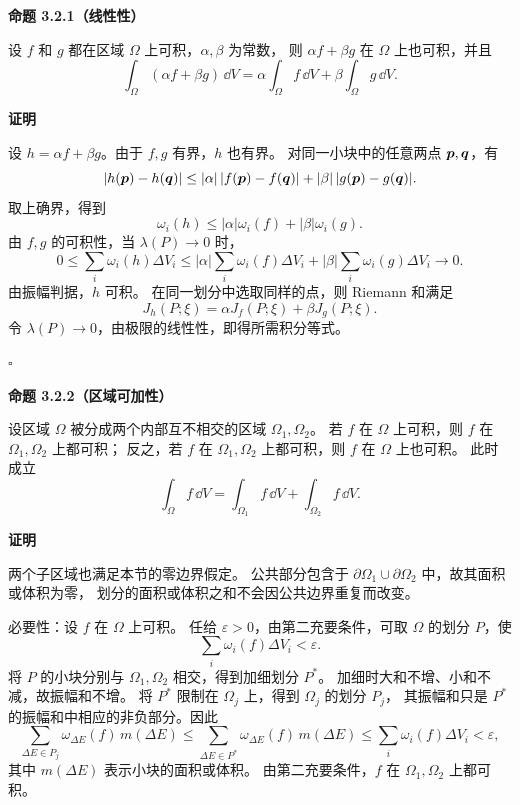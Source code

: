 \textbf{命题 3.2.1（线性性）}


设 $f$ 和 $g$ 都在区域 $\Omega$ 上可积，$\alpha,\beta$ 为常数，
则 $\alpha f+\beta g$ 在 $\Omega$ 上也可积，并且
\[
\int_\Omega(\alpha f+\beta g)\,\dd V
=\alpha\int_\Omega f\,\dd V+\beta\int_\Omega g\,\dd V.
\]





\textbf{证明}

设 $h=\alpha f+\beta g$。由于 $f,g$ 有界，$h$ 也有界。
对同一小块中的任意两点 $\boldsymbol{p},\boldsymbol{q}$，有
\[
|h(\boldsymbol{p})-h(\boldsymbol{q})|
\le|\alpha|\,|f(\boldsymbol{p})-f(\boldsymbol{q})|
+|\beta|\,|g(\boldsymbol{p})-g(\boldsymbol{q})|.
\]
取上确界，得到
\[
\omega_i(h)\le|\alpha|\omega_i(f)+|\beta|\omega_i(g).
\]
由 $f,g$ 的可积性，当 $\lambda(P)\to0$ 时，
\[
0\le\sum_i\omega_i(h)\Delta V_i
\le|\alpha|\sum_i\omega_i(f)\Delta V_i
+|\beta|\sum_i\omega_i(g)\Delta V_i\longrightarrow0.
\]
由振幅判据，$h$ 可积。
在同一划分中选取同样的点，则 Riemann 和满足
\[
J_h(P;\xi)=\alpha J_f(P;\xi)+\beta J_g(P;\xi).
\]
令 $\lambda(P)\to0$，由极限的线性性，即得所需积分等式。


$\square$





\textbf{命题 3.2.2（区域可加性）}


设区域 $\Omega$ 被分成两个内部互不相交的区域 $\Omega_1,\Omega_2$。
若 $f$ 在 $\Omega$ 上可积，则 $f$ 在 $\Omega_1,\Omega_2$ 上都可积；
反之，若 $f$ 在 $\Omega_1,\Omega_2$ 上都可积，则 $f$ 在 $\Omega$ 上也可积。
此时成立
\[
\int_\Omega f\,\dd V
=\int_{\Omega_1}f\,\dd V+\int_{\Omega_2}f\,\dd V.
\]





\textbf{证明}

两个子区域也满足本节的零边界假定。
公共部分包含于 $\partial\Omega_1\cup\partial\Omega_2$ 中，故其面积或体积为零，
划分的面积或体积之和不会因公共边界重复而改变。

必要性：设 $f$ 在 $\Omega$ 上可积。
任给 $\varepsilon>0$，由第二充要条件，可取 $\Omega$ 的划分 $P$，使
\[
\sum_i\omega_i(f)\Delta V_i<\varepsilon.
\]
将 $P$ 的小块分别与 $\Omega_1,\Omega_2$ 相交，得到加细划分 $P^*$。
加细时大和不增、小和不减，故振幅和不增。
将 $P^*$ 限制在 $\Omega_j$ 上，得到 $\Omega_j$ 的划分 $P_j$，
其振幅和只是 $P^*$ 的振幅和中相应的非负部分。因此
\[
\sum_{\Delta E\in P_j}\omega_{\Delta E}(f)\,m(\Delta E)
\le\sum_{\Delta E\in P^*}\omega_{\Delta E}(f)\,m(\Delta E)
\le\sum_i\omega_i(f)\Delta V_i<\varepsilon,
\]
其中 $m(\Delta E)$ 表示小块的面积或体积。
由第二充要条件，$f$ 在 $\Omega_1,\Omega_2$ 上都可积。

